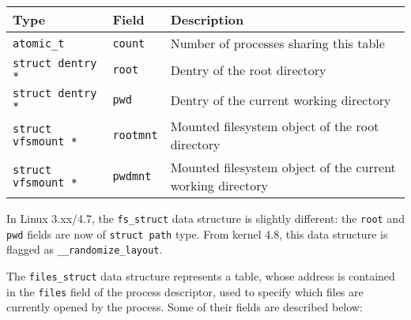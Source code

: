 \documentclass[10pt,a4paper]{article}
\begin{document}
\begin{center}
\begin{tabular}{l|l|p{13cm}} 

\toprule
Type & Field & Description \\
\midrule

\texttt{atomic\_t} & \texttt{count} & Number of processes sharing this table

\\

\texttt{struct dentry *} & \texttt{root} & Dentry of the root directory

\\

\texttt{struct dentry *} & \texttt{pwd} & Dentry of the current working directory

\\

\texttt{struct vfsmount *} & \texttt{rootmnt} & Mounted filesystem object of the root directory

\\

\texttt{struct vfsmount *} & \texttt{pwdmnt} & Mounted filesystem object of the current working directory

\\
 
\bottomrule
\end{tabular}
\end{center}

In Linux 3.xx/4.7, the \texttt{fs\_struct} data structure is slightly different: the \texttt{root} and \texttt{pwd} fields are now of \texttt{struct path} type. From kernel 4.8, this data structure is flagged as \texttt{\_\_randomize\_layout}.

The \texttt{files\_struct} data structure represents a table, whose address is contained in the \texttt{files} field of the process descriptor, used to specify which files are currently opened by the process. Some of their fields are described below:
\end{document}
